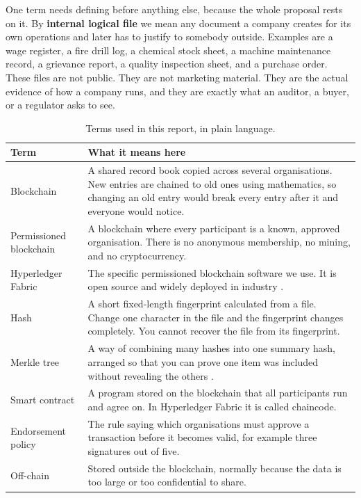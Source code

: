 \documentclass[11pt,a4paper]{article}
\begin{document}
One term needs defining before anything else, because the whole proposal rests
on it. By \textbf{internal logical file} we mean any document a company creates
for its own operations and later has to justify to somebody outside. Examples
are a wage register, a fire drill log, a chemical stock sheet, a machine
maintenance record, a grievance report, a quality inspection sheet, and a
purchase order. These files are not public. They are not marketing material.
They are the actual evidence of how a company runs, and they are exactly what an
auditor, a buyer, or a regulator asks to see.

\begin{table}[htbp]
\centering
\caption{Terms used in this report, in plain language.}
\label{tab:glossary}
\small
\begin{tabularx}{\textwidth}{@{}l Y@{}}
\toprule
\textbf{Term} & \textbf{What it means here} \\
\midrule
Blockchain & A shared record book copied across several organisations. New
entries are chained to old ones using mathematics, so changing an old entry
would break every entry after it and everyone would notice. \\
Permissioned blockchain & A blockchain where every participant is a known,
approved organisation. There is no anonymous membership, no mining, and no
cryptocurrency. \\
Hyperledger Fabric & The specific permissioned blockchain software we use. It
is open source and widely deployed in industry \citep{androulaki2018fabric}. \\
Hash & A short fixed-length fingerprint calculated from a file. Change one
character in the file and the fingerprint changes completely. You cannot
recover the file from its fingerprint. \\
Merkle tree & A way of combining many hashes into one summary hash, arranged so
that you can prove one item was included without revealing the others
\citep{merkle1988signature}. \\
Smart contract & A program stored on the blockchain that all participants run
and agree on. In Hyperledger Fabric it is called chaincode. \\
Endorsement policy & The rule saying which organisations must approve a
transaction before it becomes valid, for example three signatures out of five. \\
Off-chain & Stored outside the blockchain, normally because the data is too
large or too confidential to share. \\

\end{tabularx}
\end{table}
\end{document}
